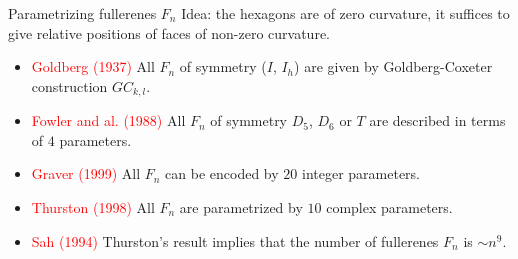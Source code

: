 \documentclass[%
pdf,
colorBG,
slideColor,
]{prosper}
\begin{document}
\begin{slide}{Parametrizing fullerenes $F_n$}
Idea: the hexagons are of zero curvature, it suffices to give relative 
positions of faces of non-zero curvature.
\begin{itemize}
\item \textcolor{red}{Goldberg (1937)} All $F_n$ of symmetry
($I$, $I_h$) are given by Goldberg-Coxeter construction $GC_{k,l}$.
\item \textcolor{red}{Fowler and al. (1988)} All $F_n$ of symmetry 
$D_5$, $D_6$ or $T$ are described in terms of $4$ parameters.
\item \textcolor{red}{Graver (1999)} All $F_n$ can be encoded by $20$ 
integer parameters.
\item \textcolor{red}{Thurston (1998)} All $F_n$
are parametrized by $10$ complex parameters.
\item \textcolor{red}{Sah (1994)} Thurston's result implies that the 
number of fullerenes $F_n$ is $\sim n^9$. 
\end{itemize}
\end{slide}
\end{document}
